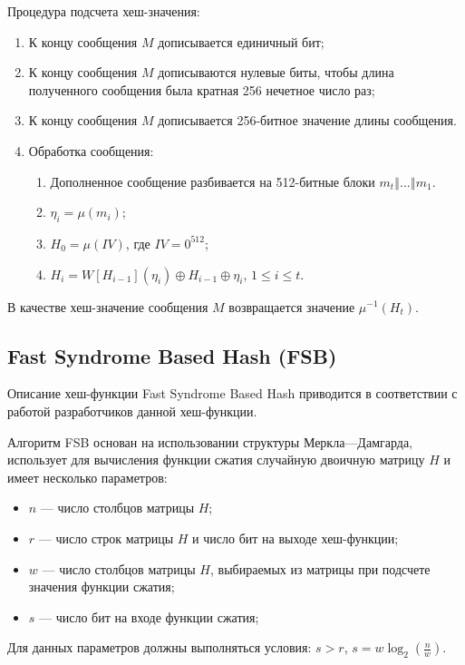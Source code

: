 \documentclass{./civarticle}
\begin{document}
Процедура подсчета хеш-значения:
\begin{enumerate}
    \item К концу сообщения $M$ дописывается единичный бит;
    \item К концу сообщения $M$ дописываются нулевые биты, чтобы длина полученного сообщения была кратная 256 нечетное число раз;
    \item К концу сообщения $M$ дописывается 256-битное значение длины сообщения.
    \item Обработка сообщения:

    \begin{enumerate}
        \item Дополненное сообщение разбивается на 512-битные блоки $m_t \mathbin\Vert ... \mathbin\Vert m_1$.
        \item $\eta_i = \mu(m_i)$;
        \item $H_0 = \mu(IV)$, где $IV = 0^{512}$;
        \item $H_i = W[H_{i-1}](\eta_i) \oplus H_{i-1} \oplus \eta_i$, $1 \leq i \leq t$.
    \end{enumerate}
    
\end{enumerate}

В качестве хеш-значение сообщения $M$ возвращается значение $\mu^{-1}(H_t)$.

\subsection{Fast Syndrome Based Hash (FSB)}

Описание хеш-функции Fast Syndrome Based Hash приводится в соответствии с работой \cite{fsb} разработчиков данной хеш-функции. 

Алгоритм FSB основан на использовании структуры Меркла—Дамгарда, использует для вычисления функции сжатия случайную двоичную матрицу $H$ и имеет несколько параметров:

\begin{itemize}
    \item $n$ --- число столбцов матрицы $H$;
    \item $r$ --- число строк матрицы $H$ и число бит на выходе хеш-функции;
    \item $w$ --- число столбцов матрицы $H$, выбираемых из матрицы при подсчете значения функции сжатия;
    \item $s$ --- число бит на входе функции сжатия;
\end{itemize}
Для данных параметров должны выполняться условия: $s > r$, $s = w\log_2(\frac{n}{w})$.
\end{document}
